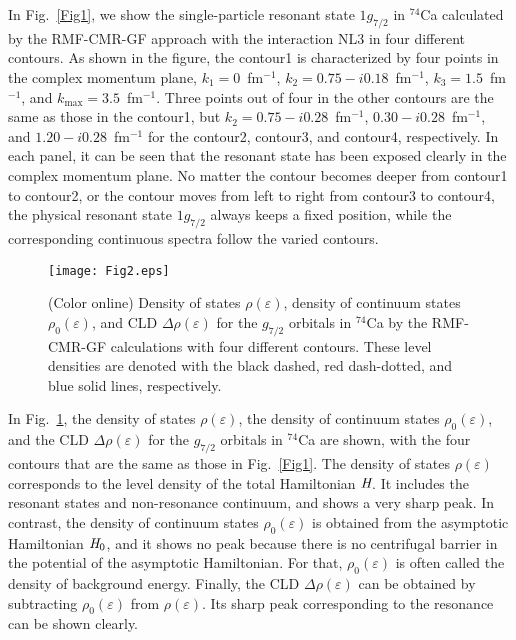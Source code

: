 \documentclass[twocolumn,prc,preprintnumbers,superscriptaddress,floatfix,showpacs]{revtex4}
\begin{document}
In Fig.~\ref{Fig1}, we show the single-particle resonant state $1g_{7/2}$ in $^{74}$Ca calculated by the RMF-CMR-GF approach with the interaction NL3 in four different contours. As shown in the figure, the contour1 is characterized by four points in the complex momentum plane, $k_1 = 0$~fm$^{-1}$, $k_2 = 0.75 -i0.18$~fm$^{-1}$, $k_3 = 1.5$~fm$^{-1}$, and $k_{\text{max}} = 3.5$~fm$^{-1}$. Three points out of four in the other contours are the same as those in the contour1, but $k_2 = 0.75 -i0.28$~fm$^{-1}$, $0.30 -i0.28$~fm$^{-1}$, and $1.20 -i0.28$~fm$^{-1}$ for the contour2, contour3, and contour4, respectively. In each panel, it can be seen that the resonant state has been exposed clearly in the complex momentum plane. No matter the contour becomes deeper from contour1 to contour2, or the contour moves from left to right from contour3 to contour4, the physical resonant state $1g_{7/2}$ always keeps a fixed position, while the corresponding continuous spectra follow the varied contours.

\begin{figure}%
\texttt{[image: Fig2.eps]}
\caption{(Color online) Density of states $\rho(\varepsilon)$, density of continuum states $\rho_{0}(\varepsilon)$, and CLD $\Delta\rho(\varepsilon)$ for the $g_{7/2}$ orbitals in $^{74}$Ca by the RMF-CMR-GF calculations with four different contours. These level densities are denoted with the black dashed, red dash-dotted, and blue solid lines, respectively.}
\label{Fig2}
\end{figure}

In Fig.~\ref{Fig2}, the density of states $\rho(\varepsilon)$, the density of continuum states $\rho_{0}(\varepsilon)$, and the CLD $\Delta\rho(\varepsilon)$ for the $g_{7/2}$ orbitals in $^{74}$Ca are shown, with the four contours that are the same as those in Fig.~\ref{Fig1}. The density of states $\rho(\varepsilon)$ corresponds to the level density of the total Hamiltonian $\emph{H}$. It includes the resonant states and non-resonance continuum, and shows a very sharp peak. In contrast, the density of continuum states $\rho_{0}(\varepsilon)$ is obtained from the asymptotic Hamiltonian $\emph{H}_{0}$, and it shows no peak because there is no centrifugal barrier in the potential of the asymptotic Hamiltonian. For that, $\rho_{0}(\varepsilon)$ is often called the density of background energy. Finally, the CLD $\Delta\rho(\varepsilon)$ can be obtained by subtracting $\rho_{0}(\varepsilon)$ from $\rho(\varepsilon)$. Its sharp peak corresponding to the resonance can be shown clearly.
\end{document}
